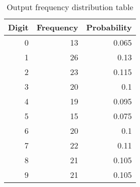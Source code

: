 \begin{table}[htbp]
  \centering
    \caption{Output frequency distribution table}
     \begin{tabular}{|r|r|r|}
    \toprule
    \hline
    \multicolumn{1}{|c|}{\textbf{Digit}} &
    \multicolumn{1}{c|}{\textbf{Frequency}} &
    \multicolumn{1}{c|}{\textbf{Probability}} \\
    \midrule
    \hline
    0     & 13    & 0.065 \\
    1     & 26    & 0.13 \\
    2     & 23    & 0.115 \\
    3     & 20    & 0.1 \\
    4     & 19    & 0.095 \\
    5     & 15    & 0.075 \\
    6     & 20    & 0.1 \\
    7     & 22    & 0.11 \\
    8     & 21    & 0.105 \\
    9     & 21    & 0.105 \\
    \hline
    \end{tabular}%
  \label{tab:addlabel}%
\end{table}%
